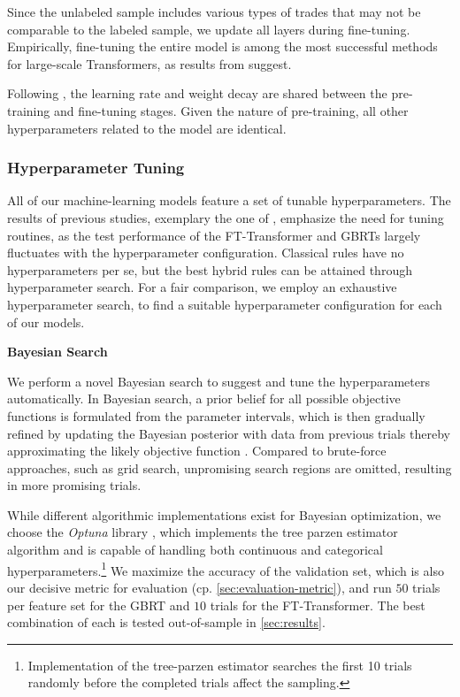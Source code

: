 Since the unlabeled sample includes various types of trades that may not be comparable to the labeled sample, we update all layers during fine-tuning. Empirically, fine-tuning the entire model is among the most successful methods for large-scale Transformers, as results from \textcite[][104--105]{raeScalingLanguageModels2022} suggest.

Following \textcite[][4]{rubachevRevisitingPretrainingObjectives2022}, the learning rate and weight decay are shared between the pre-training and fine-tuning stages. Given the nature of pre-training, all other hyperparameters related to the model are identical.

\subsubsection{Hyperparameter Tuning}\label{sec:hyperparameter-tuning}

All of our machine-learning models feature a set of tunable hyperparameters. The results of previous studies, exemplary the one of \textcite[][5]{grinsztajnWhyTreebasedModels2022}, emphasize the need for tuning routines, as the test performance of the FT-Transformer and \glspl{GBRT} largely fluctuates with the hyperparameter configuration. Classical rules have no hyperparameters per se, but the best hybrid rules can be attained through hyperparameter search.
For a fair comparison, we employ an exhaustive hyperparameter search, to find a suitable hyperparameter configuration for each of our models.

\textbf{Bayesian Search}

We perform a novel Bayesian search to suggest and tune the hyperparameters automatically. In Bayesian search, a prior belief for all possible objective functions is formulated from the parameter intervals, which is then gradually refined by updating the Bayesian posterior with data from previous trials thereby approximating the likely objective function \autocite[][2]{shahriariTakingHumanOut2016}. Compared to brute-force approaches, such as grid search, unpromising search regions are omitted, resulting in more promising trials.

While different algorithmic implementations exist for Bayesian optimization, we choose the \emph{Optuna} library \autocite[][1--10]{akibaOptunaNextgenerationHyperparameter2019}, which implements the tree parzen estimator algorithm and is capable of handling both continuous and categorical hyperparameters.\footnote{Implementation of the tree-parzen estimator searches the first 10 trials randomly before the completed trials affect the sampling.} We maximize the accuracy of the validation set, which is also our decisive metric for evaluation (cp. \cref{sec:evaluation-metric}), and run $\num{50}$ trials per feature set for the \gls{GBRT} and $\num{10}$ trials for the FT-Transformer. The best combination of each is tested out-of-sample in \cref{sec:results}.

